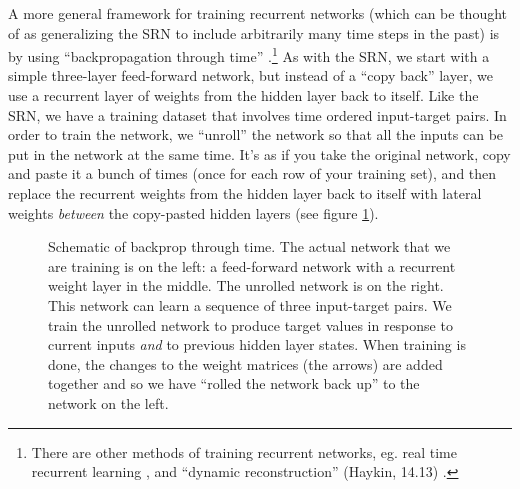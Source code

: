 A more general framework for training recurrent networks (which can be thought of as generalizing the SRN to include arbitrarily many time steps in the past) is by using ``backpropagation through time'' \cite{werbos1990bptt}.\footnote{There are other methods of training recurrent networks, eg. real time recurrent learning \cite{williams1989learning}, and ``dynamic reconstruction'' (Haykin, 14.13) \cite{haykin1998neural}.} As with the SRN, we start with a simple three-layer feed-forward network, but instead of a ``copy back''  layer, we use a recurrent layer of weights from the hidden layer back to itself. Like the SRN, we have a training dataset that involves time ordered input-target pairs. In order to train the network, we ``unroll'' the network so that all the inputs can be put in the network at the same time. It's as if you take the original network, copy and paste it a bunch of times (once for each row of your training set), and then replace the recurrent weights from the hidden layer back to itself with lateral weights \emph{between} the copy-pasted hidden layers (see figure \ref{bptt}). 

\begin{figure}[h]
\centering
{}
\caption[Jeff Yoshimi.]{Schematic of backprop through time. The actual network that we are training is on the left: a feed-forward network with a recurrent weight layer in the middle. The unrolled network is on the right. This network can learn a sequence of three input-target pairs. We train the unrolled network to produce target values in response to current inputs \emph{and} to previous hidden layer states. When training is done, the changes to the weight matrices (the arrows) are added together and so we have ``rolled the network back up'' to the network on the left.}
\label{bptt}
\end{figure}


